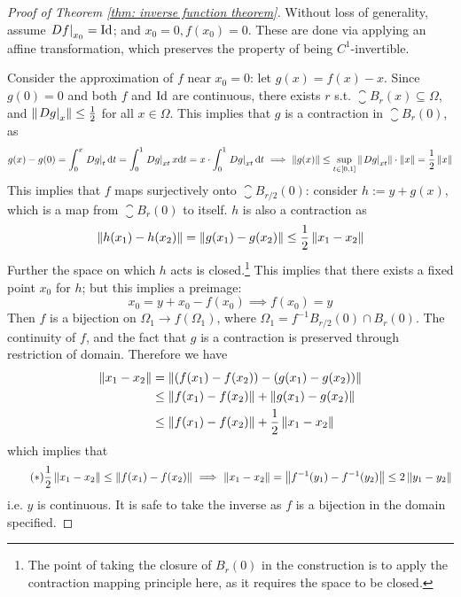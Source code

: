 \documentclass{article}
\begin{document}
\begin{proof}[Proof of Theorem \ref{thm: inverse function theorem}]
    Without loss of generality, assume $\left.Df\right|_{x_0} = \mathrm{Id}$; and $x_0 = 0, f(x_0) = 0$. These are done via applying an affine transformation, which preserves the property of being $C^1$-invertible. 

    Consider the approximation of $f$ near $x_0 = 0$: let $g(x) = f(x) - x$. Since $g(0) = 0$ and both $f$ and $\mathrm{Id}$ are continuous, there exists $r$ s.t. $\closure{B_r(x)} \subseteq \Omega$, and $\left\|\left.Dg\right|_{x}\right\| \leq \frac{1}{2}$ for all $x \in \Omega$. This implies that $g$ is a contraction in $\closure{B_r(0)}$, as
    \[
        g(x) - g(0) = \int_{0}^{x} \left.Dg\right|_{t} \mathrm{d}t = \int_{0}^{1} \left.Dg\right|_{xt} x \mathrm{d}t = x\cdot \int_{0}^{1} \left.Dg\right|_{xt} \mathrm{d}t \ \Longrightarrow\  
        \left\|g(x)\right\| \leq \sup_{t \in [0, 1]} \left\|\left.Dg\right|_{xt}\right\| \cdot \left\|x\right\| = \frac{1}{2} \left\|x\right\|
    \]
    This implies that $f$ maps surjectively onto $\closure{B_{r/2}(0)}$: consider $h := y + g(x)$, which is a map from $\closure{B_r(0)}$ to itself. $h$ is also a contraction as
    \[
        \left\|h(x_1) - h(x_2)\right\| = \left\|g(x_1) - g(x_2)\right\| \leq \frac{1}{2} \left\|x_1 - x_2\right\|
    \] 
    Further the space on which $h$ acts is closed.\footnote{The point of taking the closure of $B_r(0)$ in the construction is to apply the contraction mapping principle here, as it requires the space to be closed.} This implies that there exists a fixed point $x_0$ for $h$; but this implies a preimage:
    \[
        x_0 = y + x_0 - f(x_0) \implies f(x_0) = y
    \]
    Then $f$ is a bijection on $\Omega_1 \to f(\Omega_1)$, where $\Omega_1 = f^{-1} B_{r/2}(0) \cap B_r(0)$. The continuity of $f$, and the fact that $g$ is a contraction is preserved through restriction of domain. Therefore we have
    \begin{align*}
        \left\|x_1 - x_2\right\| 
        & = \left\|(f(x_1) - f(x_2)) - (g(x_1) - g(x_2))\right\| \\
        & \leq \left\|f(x_1) - f(x_2)\right\| + \left\|g(x_1) - g(x_2)\right\| \\
        & \leq \left\|f(x_1) - f(x_2)\right\| + \frac{1}{2} \left\|x_1 - x_2\right\|
    \end{align*}
    which implies that 
    \begin{equation}\tag{$\ast$}\label{eq: linear bound on f}
        \frac{1}{2} \left\|x_1 - x_2\right\| \leq \left\|f(x_1) - f(x_2)\right\| \ \Longrightarrow\  \left\|x_1 - x_2\right\| = \left\|f^{-1}(y_1) - f^{-1}(y_2)\right\| \leq 2\left\|y_1 - y_2\right\|
    \end{equation}
    i.e. $y$ is continuous. It is safe to take the inverse as $f$ is a bijection in the domain specified. 


\end{proof}
\end{document}
